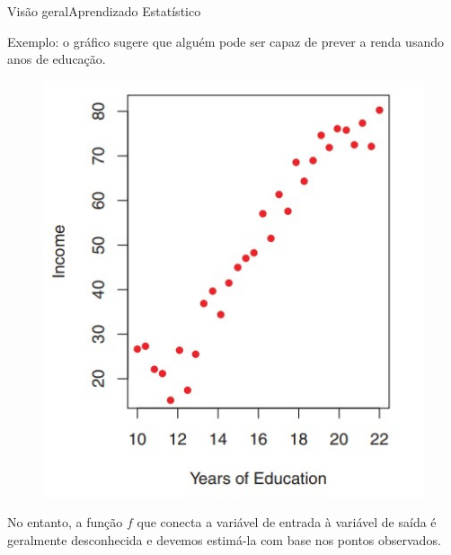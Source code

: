 \documentclass[t]{beamer}
\begin{document}
\begin{ftst}{Visão geral}{{Aprendizado Estatístico}}
\justifying

Exemplo: o gráfico sugere que alguém pode ser capaz de prever a renda usando anos de educação.

\begin{figure}
    \centering
    \includegraphics[scale=0.3]{Figuras/slide03_05.jpg}
\end{figure}

No entanto, a função $f$ que conecta a variável de entrada à variável de saída é geralmente desconhecida e devemos estimá-la com base nos pontos observados.


\end{ftst}

\end{document}
